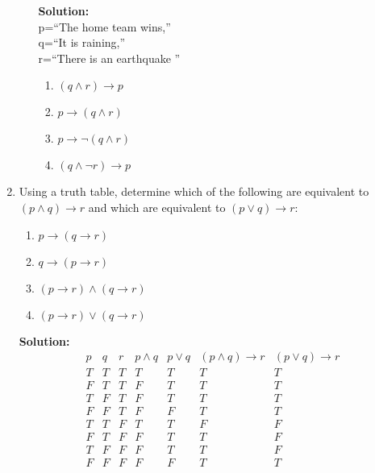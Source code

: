 \documentclass[12pt]{article}
\begin{document}
\begin{enumerate}
\begin{enumerate}
                \textbf{Solution: } \\
                p=``The home team wins,'' \\
                q=``It is raining,'' \\
                r=``There is an earthquake ''
                \begin{enumerate}
                    \item $(q \wedge r) \rightarrow p $
                    \item $p \rightarrow (q \wedge r) $
                    \item $p \rightarrow \neg(q \wedge r) $
                    \item $ (q \wedge \neg r) \rightarrow p$
                \end{enumerate}

        \end{enumerate}

    \item Using a truth table, determine which of the following are equivalent to $(p \wedge q) \rightarrow r$ and which are equivalent to $(p \vee q) \rightarrow r$:
\begin{enumerate}
    \item $p \rightarrow (q \rightarrow r)$
    \item $q \rightarrow (p \rightarrow r) $
    \item $(p \rightarrow r) \wedge (q \rightarrow r) $
    \item $(p \rightarrow r) \vee (q \rightarrow r)$
\end{enumerate}

\textbf{Solution: } \\
\begin{displaymath}
\begin{array}{|c|c|c|c|c|c|c|}
    p & q & r & p \wedge q & p \vee q & (p \wedge q) \rightarrow r & (p \vee q) \rightarrow r \\
\hline
T & T & T & T & T & T & T \\
F & T & T & F & T & T & T \\
T & F & T & F & T & T & T \\
F & F & T & F & F & T & T \\
T & T & F & T & T & F & F \\
F & T & F & F & T & T & F \\
T & F & F & F & T & T & F \\
F & F & F & F & F & T & T \\
\end{array}
\end{displaymath}



\end{enumerate}
\end{document}
